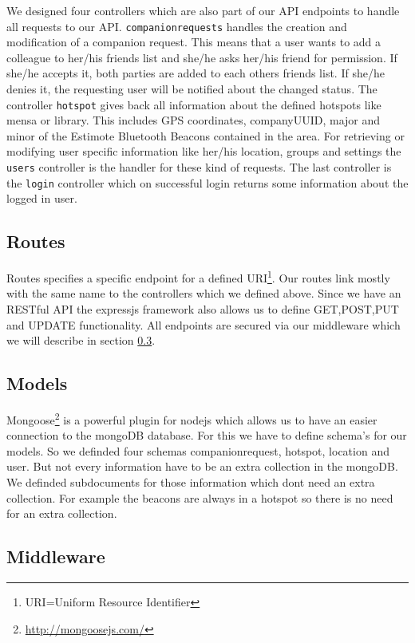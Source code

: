 We designed four controllers which are also part of our API endpoints to handle all requests to our API. \texttt{companionrequests} handles the creation and modification of a companion request. This means that a user wants to add a colleague to her/his friends list and she/he asks her/his friend for permission. If she/he accepts it, both parties are added to each others friends list. If she/he denies it, the requesting user will be notified about the changed status. The controller \texttt{hotspot} gives back all information about the defined hotspots like mensa or library. This includes GPS coordinates, companyUUID, major and minor of the Estimote Bluetooth Beacons contained in the area. For retrieving or modifying user specific information like her/his location, groups and settings the \texttt{users} controller is the handler for these kind of requests. The last controller is the \texttt{login} controller which on successful login returns some information about the logged in user.

\subsection{Routes}

Routes specifies a specific endpoint for a defined URI\footnote{URI=Uniform Resource Identifier}. Our routes link mostly with the same name to the controllers which we defined above. Since we have an RESTful API the expressjs framework also allows us to define GET,POST,PUT and UPDATE functionality. All endpoints are secured via our middleware which we will describe in section \ref{backend-middleware}.

\subsection{Models}
\label{mongodb-models}

Mongoose\footnote{\url{http://mongoosejs.com/}} is a powerful plugin for nodejs which allows us to have an easier connection to the mongoDB database. For this we have to define schema's for our models. So we definded four schemas companionrequest, hotspot, location and user. But not every information have to be an extra collection in the mongoDB. We definded subdocuments for those information which dont need an extra collection. For example the beacons are always in a hotspot so there is no need for an extra collection.


\subsection{Middleware}
\label{backend-middleware}

